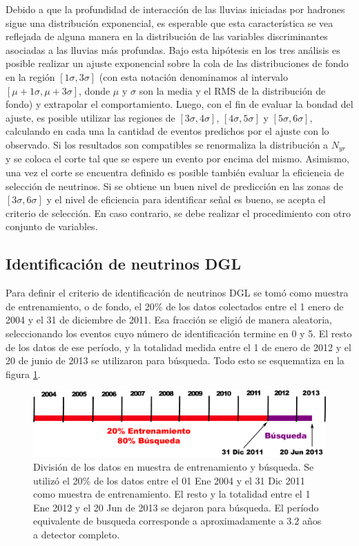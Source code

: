 	Debido a que la profundidad de interacción de las lluvias iniciadas por hadrones sigue una distribución exponencial, es esperable que esta característica se vea reflejada de alguna manera en la distribución de las variables discriminantes asociadas a las lluvias más profundas.
	Bajo esta hipótesis en los tres análisis es posible realizar un ajuste exponencial sobre la cola de las distribuciones de fondo en la región $[1\sigma, 3\sigma]$ (con esta notación denominamos al intervalo $[\mu+1\sigma, \mu+3\sigma]$, donde $\mu$ y $\sigma$ son la media y el RMS de la distribución de fondo) y extrapolar el comportamiento.
	Luego, con el fin de evaluar la bondad del ajuste, es posible utilizar las regiones de $[3\sigma, 4\sigma]$, $[4\sigma, 5\sigma]$ y $[5\sigma, 6\sigma]$, calculando en cada una la cantidad de eventos predichos por el ajuste con lo observado.
	Si los resultados son compatibles se renormaliza la distribución a $N_{yr}$ y se coloca el corte tal que se espere un evento por encima del mismo.
	Asimismo, una vez el corte se encuentra definido es posible también evaluar la eficiencia de selección de neutrinos.
	Si se obtiene un buen nivel de predicción en las zonas de $[3\sigma, 6\sigma]$ y el nivel de eficiencia para identificar señal es bueno, se acepta el criterio de selección.
	En caso contrario, se debe realizar el procedimiento con otro conjunto de variables.
	
	\subsection{Identificación de neutrinos DGL}
	
	Para definir el criterio de identificación de neutrinos DGL se tomó como muestra de entrenamiento, o de fondo, el 20$\%$ de los datos colectados entre el 1 enero de 2004 y el 31 de diciembre de 2011.
	Esa fracción se eligió de manera aleatoria, seleccionando los eventos cuyo número de identificación termine en 0 y 5.
	El resto de los datos de ese período, y la totalidad medida entre el 1 de enero de 2012 y el 20 de junio de 2013 se utilizaron para búsqueda.
	Todo esto se esquematiza en la figura \ref{fig:periodosDGL}.
	\begin{figure}[ht]
	\begin{center}
	\includegraphics[width=\textwidth]{fig/seleccionAuger/periodosDGL}
	\caption{División de los datos en muestra de entrenamiento y búsqueda. Se utilizó el 20$\%$ de los datos entre el 01 Ene 2004 y el 31 Dic 2011 como muestra de entrenamiento. El resto y la totalidad entre el 1 Ene 2012 y el 20 Jun de 2013 se dejaron para búsqueda. El período equivalente de busqueda corresponde a aproximadamente a 3.2 años a detector completo.}
	\label{fig:periodosDGL}
	\end{center}
	\end{figure}
	
